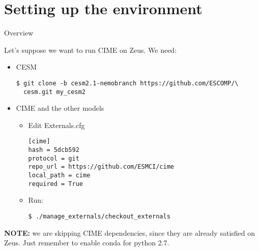 \section{Setting up the environment}

\begin{frame}[fragile]{Overview}

Let's suppose we want to run CIME on Zeus. We need:

\begin{itemize}
    \item<2-> CESM
    \begin{verbatim}
$ git clone -b cesm2.1-nemobranch https://github.com/ESCOMP/\
  cesm.git my_cesm2
    \end{verbatim}

    \item<3-> CIME and the other models
    \begin{itemize}
        \item Edit Externals.cfg
\begin{verbatim}
[cime]
hash = 5dcb592
protocol = git
repo_url = https://github.com/ESMCI/cime
local_path = cime
required = True
\end{verbatim}        
        
        \item Run:
        \begin{verbatim}
$ ./manage_externals/checkout_externals
        \end{verbatim}
    \end{itemize}
\end{itemize}

\textbf{NOTE:} we are skipping CIME dependencies, since they are already satisfied on Zeus. Just remember to enable conda for python 2.7.
    
\end{frame}